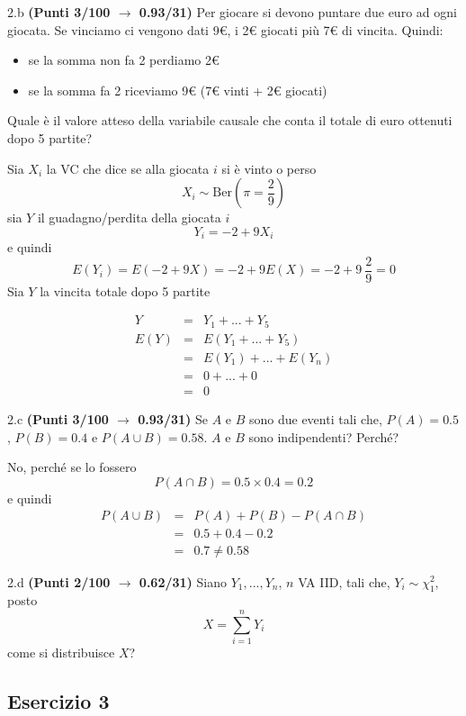 \documentclass[
  11pt,
]{book}
\providecommand{\tightlist}{%
  \setlength{\itemsep}{0pt}\setlength{\parskip}{0pt}}
\theoremstyle{mytheoremstyle}
\theoremstyle{mydefstyle}
\newenvironment{sol}
  {
  \begin{tcolorbox}[enhanced,breakable,arc=0.1mm,boxrule=1pt,colback=white,colframe=iblue,
  title=\bf \fontfamily{lmss}\selectfont \hspace{.5 cm} Soluzione,drop fuzzy shadow]

}{
\end{tcolorbox}
  }
\begin{document}
2.b \textbf{(Punti 3/100 \(\rightarrow\) 0.93/31)} Per giocare si devono puntare due euro ad ogni giocata. Se vinciamo ci vengono dati 9€, i 2€ giocati più 7€ di vincita. Quindi:

\begin{itemize}
\tightlist
\item
  se la somma non fa 2 perdiamo 2€
\item
  se la somma fa 2 riceviamo 9€ (7€ vinti + 2€ giocati)
\end{itemize}

Quale è il valore atteso della variabile causale che conta il totale di euro ottenuti dopo 5 partite?

\begin{sol}
Sia \(X_i\) la VC che dice se alla giocata \(i\) si è vinto o perso
\[
X_i\sim\text{Ber}\left(\pi=\frac 29\right)
\]
sia \(Y\) il guadagno/perdita della giocata \(i\)
\[
Y_i=-2+9X_i
\]
e quindi
\[
E(Y_i)=E(-2+9X)=-2+9E(X)=-2+9~\frac29=0
\]
Sia \(Y\) la vincita totale dopo 5 partite

\begin{eqnarray*}
  Y  &=&Y_1+...+Y_5\\
E(Y) &=&E(Y_1+...+Y_5)\\
     &=&E(Y_1)+...+E(Y_n)\\
     &=& 0+...+0\\
     &=& 0
\end{eqnarray*}

\end{sol}

2.c \textbf{(Punti 3/100 \(\rightarrow\) 0.93/31)} Se \(A\) e \(B\) sono due eventi tali che, \(P(A)=0.5\), \(P(B)=0.4\) e \(P(A\cup B)=0.58\). \(A\) e \(B\) sono indipendenti? Perché?

\begin{sol}
No, perché se lo fossero
\[
P(A\cap B)=0.5\times 0.4=0.2
\]
e quindi
\begin{eqnarray*}
  P(A\cup B) &=& P(A)+P(B)-P(A\cap B)\\
             &=& 0.5+0.4-0.2\\
             &=& 0.7\ne 0.58
\end{eqnarray*}

\end{sol}

2.d \textbf{(Punti 2/100 \(\rightarrow\) 0.62/31)} Siano \(Y_1,...,Y_n\), \(n\) VA IID, tali che, \(Y_i\sim\chi_{1}^2\), posto
\[
X=\sum_{i=1}^n Y_i
\]
come si distribuisce \(X\)?

\subsection{Esercizio 3}\label{esercizio-3-8}
\end{document}
